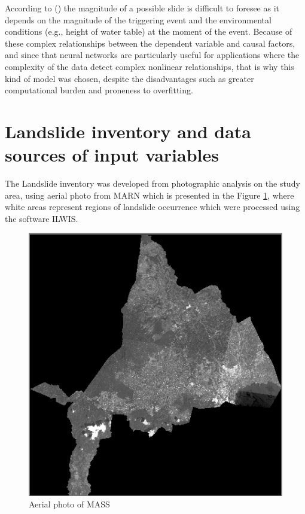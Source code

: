 \documentclass[11pt,twoside]{rmta2010esp}%
\begin{document}
According to (\cite{van2006landslide}) the magnitude of a possible
slide is difficult to foresee as it depends on the magnitude of the triggering event and the environmental conditions (e.g., height of water table) at the moment of the event. Because of these complex relationships between the dependent variable and causal factors, and since that neural networks are particularly useful for applications where the complexity of the data detect complex nonlinear relationships, that is why this kind of model was chosen, despite the disadvantages such as greater computational burden and proneness to overfitting.  





\section{Landslide inventory and data sources of input variables}
\label{sec:landsinvet}
The Landslide inventory was developed from photographic analysis on the study area, using 
aerial photo from MARN which is presented in the Figure \ref{fig:img01}, where white areas represent regions of landslide occurrence which were processed using the software ILWIS. 

 \begin{center}
  \begin{figure}[H]
   \centering
   \includegraphics[scale=0.40]{img01}
   \caption{\small{Aerial photo of MASS}}
   \label{fig:img01}
  \end{figure}
 \end{center}
\end{document}
